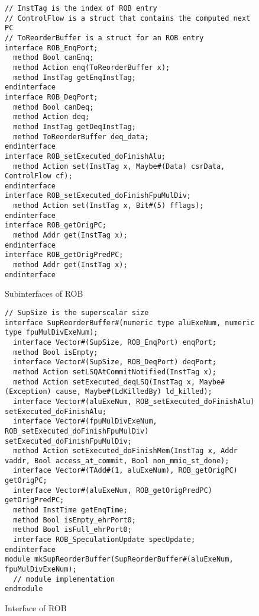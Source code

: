 \begin{figure}[!htb]
\begin{lstlisting}[caption={}]
// InstTag is the index of ROB entry
// ControlFlow is a struct that contains the computed next PC
// ToReorderBuffer is a struct for an ROB entry
interface ROB_EnqPort;
  method Bool canEnq;
  method Action enq(ToReorderBuffer x);
  method InstTag getEnqInstTag;
endinterface
interface ROB_DeqPort;
  method Bool canDeq;
  method Action deq;
  method InstTag getDeqInstTag;
  method ToReorderBuffer deq_data;
endinterface
interface ROB_setExecuted_doFinishAlu;
  method Action set(InstTag x, Maybe#(Data) csrData, ControlFlow cf);
endinterface
interface ROB_setExecuted_doFinishFpuMulDiv;
  method Action set(InstTag x, Bit#(5) fflags);
endinterface
interface ROB_getOrigPC;
  method Addr get(InstTag x);
endinterface
interface ROB_getOrigPredPC;
  method Addr get(InstTag x);
endinterface
\end{lstlisting}
\caption{Subinterfaces of ROB}\label{fig:rob-subifc}
\end{figure}

\begin{figure}[!htb]
\begin{lstlisting}[caption={}]
// SupSize is the superscalar size
interface SupReorderBuffer#(numeric type aluExeNum, numeric type fpuMulDivExeNum);
  interface Vector#(SupSize, ROB_EnqPort) enqPort;
  method Bool isEmpty;
  interface Vector#(SupSize, ROB_DeqPort) deqPort;
  method Action setLSQAtCommitNotified(InstTag x);
  method Action setExecuted_deqLSQ(InstTag x, Maybe#(Exception) cause, Maybe#(LdKilledBy) ld_killed);
  interface Vector#(aluExeNum, ROB_setExecuted_doFinishAlu) setExecuted_doFinishAlu;
  interface Vector#(fpuMulDivExeNum, ROB_setExecuted_doFinishFpuMulDiv) setExecuted_doFinishFpuMulDiv;
  method Action setExecuted_doFinishMem(InstTag x, Addr vaddr, Bool access_at_commit, Bool non_mmio_st_done);
  interface Vector#(TAdd#(1, aluExeNum), ROB_getOrigPC) getOrigPC;
  interface Vector#(aluExeNum, ROB_getOrigPredPC) getOrigPredPC;
  method InstTime getEnqTime;
  method Bool isEmpty_ehrPort0;
  method Bool isFull_ehrPort0;
  interface ROB_SpeculationUpdate specUpdate;
endinterface
module mkSupReorderBuffer(SupReorderBuffer#(aluExeNum, fpuMulDivExeNum);
  // module implementation
endmodule
\end{lstlisting}
\caption{Interface of ROB}\label{fig:rob-ifc}
\end{figure}

